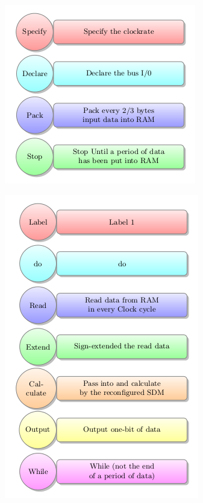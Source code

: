 \documentclass{FR16}
\begin{document}
\begin{enumerate}
\begin{figure}[H]
    \begin{subfigure}{\textwidth}
    \includegraphics[scale=1]{analysis.png} 
    \label{fig:DJp1}
    \end{subfigure}
 
\label{fig6}
\end{figure}



   \begin{figure}[H]
 
    \begin{subfigure}{\textwidth}
    \includegraphics[scale=1]{analysis1.png} 
    \label{fig:DJp1}
    \end{subfigure}
 

\end{figure}
\end{enumerate}
\end{document}
